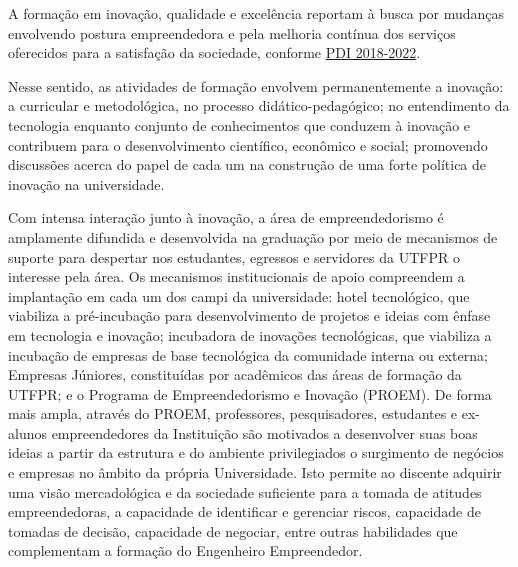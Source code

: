 A formação em inovação, qualidade e excelência reportam à busca por mudanças envolvendo postura empreendedora e pela melhoria contínua dos serviços oferecidos para a satisfação da sociedade, conforme \href{https://cloud.utfpr.edu.br/index.php/s/15P0OcMLMdt9Rv7}{PDI 2018-2022}.

Nesse sentido, as atividades de formação envolvem permanentemente a inovação: a curricular e metodológica, no processo didático-pedagógico; no entendimento da tecnologia enquanto conjunto de conhecimentos que conduzem à inovação e contribuem para o desenvolvimento científico, econômico e social; promovendo discussões acerca do papel de cada um na construção de uma forte política de inovação na universidade.

Com intensa interação junto à inovação, a área de empreendedorismo é amplamente difundida e desenvolvida na graduação por meio de mecanismos de suporte para despertar nos estudantes, egressos e servidores da UTFPR o interesse pela área. Os mecanismos institucionais de apoio compreendem a implantação em cada um dos campi da universidade: hotel tecnológico, que viabiliza a pré-incubação para desenvolvimento de projetos e ideias com ênfase em tecnologia e inovação; incubadora de inovações tecnológicas, que viabiliza a incubação de empresas de base tecnológica da comunidade interna ou externa; Empresas Júniores, constituídas por acadêmicos das áreas de formação da UTFPR; e o Programa de Empreendedorismo e Inovação (PROEM).  De forma mais ampla, através do PROEM, professores, pesquisadores, estudantes e ex-alunos empreendedores da Instituição são motivados a desenvolver suas boas ideias a partir da estrutura e do ambiente privilegiados o surgimento de negócios e empresas no âmbito da própria Universidade.  Isto permite ao discente adquirir uma visão mercadológica e da sociedade suficiente para a tomada de atitudes empreendedoras, a capacidade de identificar e gerenciar riscos, capacidade de tomadas de decisão, capacidade de negociar, entre outras habilidades que complementam a formação do Engenheiro Empreendedor.


